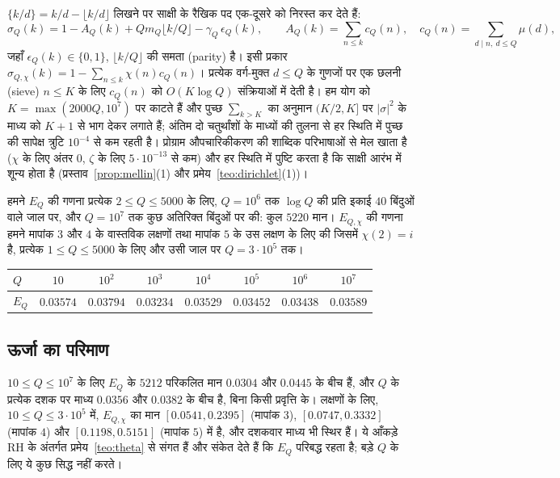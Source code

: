 \documentclass[11pt,a4paper]{amsart}
\theoremstyle{definition}
\theoremstyle{remark}
\begin{document}
$\{k/d\}=k/d-\lfloor k/d\rfloor$ लिखने पर साक्षी के रैखिक पद एक-दूसरे को निरस्त कर देते हैं:
\[
\sigma_Q(k)=1-A_Q(k)+Qm_Q\lfloor k/Q\rfloor-\gamma_Q\,\epsilon_Q(k),\qquad
A_Q(k)=\sum_{n\le k}c_Q(n),\quad c_Q(n)=\sum_{d\mid n,\ d\le Q}\mu(d),
\]
जहाँ $\epsilon_Q(k)\in\{0,1\}$, $\lfloor k/Q\rfloor$ की समता (parity) है। इसी प्रकार $\sigma_{Q,\chi}(k)=1-\sum_{n\le k}\chi(n)c_Q(n)$। प्रत्येक वर्ग-मुक्त $d\le Q$ के गुणजों पर एक छलनी (sieve) $n\le K$ के लिए $c_Q(n)$ को $O(K\log Q)$ संक्रियाओं में देती है। हम योग को $K=\max(2000Q,10^7)$ पर काटते हैं और पुच्छ $\sum_{k>K}$ का अनुमान $(K/2,K]$ पर $|\sigma|^2$ के माध्य को $K+1$ से भाग देकर लगाते हैं; अंतिम दो चतुर्थांशों के माध्यों की तुलना से हर स्थिति में पुच्छ की सापेक्ष त्रुटि $10^{-4}$ से कम रहती है। प्रोग्राम औपचारिकीकरण की शाब्दिक परिभाषाओं से मेल खाता है ($\chi$ के लिए अंतर $0$, $\zeta$ के लिए $5\cdot10^{-13}$ से कम) और हर स्थिति में पुष्टि करता है कि साक्षी आरंभ में शून्य होता है (प्रस्ताव~\ref{prop:mellin}(1) और प्रमेय~\ref{teo:dirichlet}(1))।

हमने $E_Q$ की गणना प्रत्येक $2\le Q\le5000$ के लिए, $Q=10^6$ तक $\log Q$ की प्रति इकाई $40$ बिंदुओं वाले जाल पर, और $Q=10^7$ तक कुछ अतिरिक्त बिंदुओं पर की: कुल $5220$ मान। $E_{Q,\chi}$ की गणना हमने मापांक $3$ और $4$ के वास्तविक लक्षणों तथा मापांक $5$ के उस लक्षण के लिए की जिसमें $\chi(2)=i$ है, प्रत्येक $1\le Q\le5000$ के लिए और उसी जाल पर $Q=3\cdot10^5$ तक।

\begin{center}
\begin{tabular}{lccccccc}
\toprule
$Q$ & $10$ & $10^2$ & $10^3$ & $10^4$ & $10^5$ & $10^6$ & $10^7$\\
\midrule
$E_Q$ & $0.03574$ & $0.03794$ & $0.03234$ & $0.03529$ & $0.03452$ & $0.03438$ & $0.03589$\\
\bottomrule
\end{tabular}
\end{center}

\subsection*{ऊर्जा का परिमाण}
$10\le Q\le10^7$ के लिए $E_Q$ के $5212$ परिकलित मान $0.0304$ और $0.0445$ के बीच हैं, और $Q$ के प्रत्येक दशक पर माध्य $0.0356$ और $0.0382$ के बीच है, बिना किसी प्रवृत्ति के। लक्षणों के लिए, $10\le Q\le3\cdot10^5$ में, $E_{Q,\chi}$ का मान $[0.0541,0.2395]$ (मापांक $3$), $[0.0747,0.3332]$ (मापांक $4$) और $[0.1198,0.5151]$ (मापांक $5$) में है, और दशकवार माध्य भी स्थिर हैं। ये आँकड़े RH के अंतर्गत प्रमेय~\ref{teo:theta} से संगत हैं और संकेत देते हैं कि $E_Q$ परिबद्ध रहता है; बड़े $Q$ के लिए ये कुछ सिद्ध नहीं करते।
\end{document}
